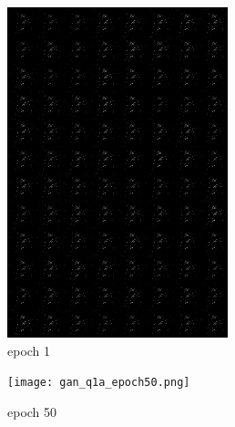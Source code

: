 \documentclass[a4paper]{article}
\theoremstyle{definition}
\begin{document}
\begin{enumerate} [label=(\alph*)]
		\begin{figure}[H]
			\centering
			\begin{subfigure}[b]{0.3\textwidth}
				\centering
				\includegraphics[width=\textwidth]{gan_q1a_epoch1.png}
				\caption{epoch 1}
			\end{subfigure}
			\hfill
			\begin{subfigure}[b]{0.3\textwidth}
				\centering
				\texttt{[image: gan\_q1a\_epoch50.png]}
				\caption{epoch 50}
			\end{subfigure}
			\hfill
			\begin{subfigure}[b]{0.3\textwidth}
				\centering

\end{subfigure}
\end{figure}
\end{enumerate}
\end{document}
